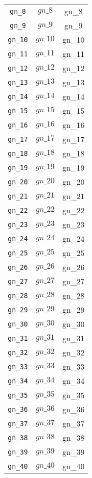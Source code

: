 \begin{center}
\begin{longtable}{ccc}
\texttt{gn\_8} & $gn\_8$ & gn\_8\\
\texttt{gn\_9} & $gn\_9$ & gn\_9\\
\texttt{gn\_10} & $gn\_10$ & gn\_10\\
\texttt{gn\_11} & $gn\_11$ & gn\_11\\
\texttt{gn\_12} & $gn\_12$ & gn\_12\\
\texttt{gn\_13} & $gn\_13$ & gn\_13\\
\texttt{gn\_14} & $gn\_14$ & gn\_14\\
\texttt{gn\_15} & $gn\_15$ & gn\_15\\
\texttt{gn\_16} & $gn\_16$ & gn\_16\\
\texttt{gn\_17} & $gn\_17$ & gn\_17\\
\texttt{gn\_18} & $gn\_18$ & gn\_18\\
\texttt{gn\_19} & $gn\_19$ & gn\_19\\
\texttt{gn\_20} & $gn\_20$ & gn\_20\\
\texttt{gn\_21} & $gn\_21$ & gn\_21\\
\texttt{gn\_22} & $gn\_22$ & gn\_22\\
\texttt{gn\_23} & $gn\_23$ & gn\_23\\
\texttt{gn\_24} & $gn\_24$ & gn\_24\\
\texttt{gn\_25} & $gn\_25$ & gn\_25\\
\texttt{gn\_26} & $gn\_26$ & gn\_26\\
\texttt{gn\_27} & $gn\_27$ & gn\_27\\
\texttt{gn\_28} & $gn\_28$ & gn\_28\\
\texttt{gn\_29} & $gn\_29$ & gn\_29\\
\texttt{gn\_30} & $gn\_30$ & gn\_30\\
\texttt{gn\_31} & $gn\_31$ & gn\_31\\
\texttt{gn\_32} & $gn\_32$ & gn\_32\\
\texttt{gn\_33} & $gn\_33$ & gn\_33\\
\texttt{gn\_34} & $gn\_34$ & gn\_34\\
\texttt{gn\_35} & $gn\_35$ & gn\_35\\
\texttt{gn\_36} & $gn\_36$ & gn\_36\\
\texttt{gn\_37} & $gn\_37$ & gn\_37\\
\texttt{gn\_38} & $gn\_38$ & gn\_38\\
\texttt{gn\_39} & $gn\_39$ & gn\_39\\
\texttt{gn\_40} & $gn\_40$ & gn\_40\\
\hline%
\end{longtable}
\end{center}

